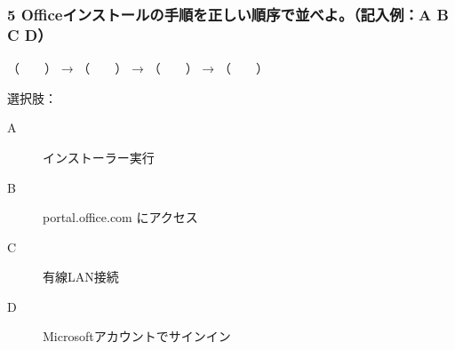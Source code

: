 \documentclass[a4paper,6pt]{jsarticle}
\begin{document}
\subsubsection*{5 Officeインストールの手順を正しい順序で並べよ。（記入例：A B C D）}
（　　） → （　　） → （　　） → （　　）

\noindent 選択肢： 
\begin{description}
  \item[A] インストーラー実行
  \item[B] portal.office.com にアクセス
  \item[C] 有線LAN接続
  \item[D] Microsoftアカウントでサインイン
\end{description}
\end{document}
